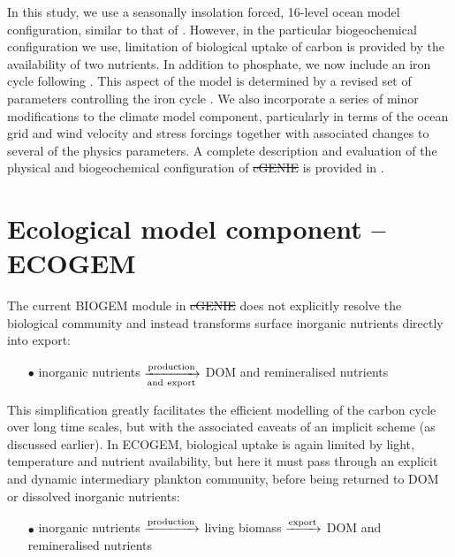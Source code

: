 \documentclass[gmd, manuscript]{copernicus}
\providecommand{\DIFadd}[1]{{\protect\color{blue}\uwave{#1}}} %
\providecommand{\DIFdel}[1]{{\protect\color{red}\sout{#1}}}                      %
\providecommand{\DIFaddbegin}{} %
\providecommand{\DIFaddend}{} %
\providecommand{\DIFdelbegin}{} %
\providecommand{\DIFdelend}{} %
\begin{document}
In this study, we use a seasonally insolation forced, 16-level ocean model configuration, similar to that of \citet{Cao:2009}. However, in the particular biogeochemical configuration we use, limitation of biological uptake of carbon is provided by the availability of two nutrients. In addition to phosphate, we now include an iron cycle following \citep{Tagliabue:2016}. This aspect of the model is determined by a revised set of parameters controlling the iron cycle \citep{Ridgwell:prep}. We also incorporate a series of minor modifications to the climate model component, particularly in terms of the  ocean grid and wind velocity and stress forcings \citep[consistent with][]{Marsh:2011} together with associated changes to several of the  physics parameters. A complete description and evaluation of the physical and biogeochemical  configuration of \DIFdelbegin \DIFdel{cGENIE }\DIFdelend \DIFaddbegin \DIFadd{cGEnIE }\DIFaddend is provided in \citep{Ridgwell:prep}.     

 

%
\section{Ecological model component -- ECOGEM}\label{ECOGEM}

The current BIOGEM module in \DIFdelbegin \DIFdel{cGENIE }\DIFdelend \DIFaddbegin \DIFadd{cGEnIE }\DIFaddend does not explicitly resolve the biological community and instead transforms surface inorganic nutrients directly into export:

\begin{itemize}
\item[$\bullet$] inorganic nutrients $\xrightarrow[\rm and~export]{\rm production}$ DOM and remineralised nutrients
\end{itemize}

\noindent This simplification greatly facilitates the efficient modelling of the carbon cycle over long time scales, but with the associated  caveats of an implicit scheme (as discussed earlier). In ECOGEM, biological uptake is again limited by light, temperature and nutrient availability, but here it must pass through an explicit and dynamic intermediary plankton community, before being returned to DOM or dissolved inorganic nutrients:


\begin{itemize}
\item[$\bullet$] {inorganic nutrients} $\xrightarrow[]{\rm production}$ {living biomass} $\xrightarrow[]{\rm export}$ {DOM and remineralised nutrients}
\end{itemize}
\end{document}
